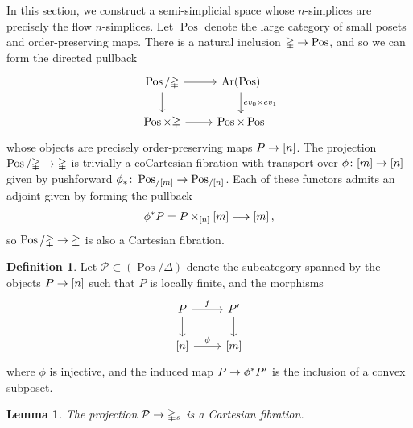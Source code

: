\documentclass[10pt]{amsart}
\numberwithin{equation}{section}
\newtheorem{lem}[prop]{Lemma}
\theoremstyle{definition}
\newtheorem{definition}[prop]{Definition}
\DeclareMathOperator{\Ar}{Ar}
\DeclareMathOperator{\Pos}{Pos}
\newcommand{\Simp}{\mathbb{\Delta}}
\newcommand{\cP}{\mathcal{P}}
\renewcommand{\to}{\mathchoice{\longrightarrow}{\rightarrow}{}{}}
\begin{document}
In this section, we construct a semi-simplicial space whose $n$-simplices are precisely the flow $n$-simplices.
Let $\Pos$ denote the large category of small posets and order-preserving maps.
There is a natural inclusion $\Simp \to \Pos$, and so we can form the directed pullback
\begin{equation*}
	\begin{tikzcd}
		\Pos / \Simp \arrow[r] \arrow[d]      &   \Ar(\Pos)  \arrow[d, "ev_{0}\times ev_{1}"] \\
		\Pos \times \Simp  \arrow[r]               &  \Pos\times \Pos
	\end{tikzcd}
\end{equation*}
whose objects are precisely order-preserving maps $P\to [n]$.
The projection $\Pos / \Simp \to \Simp$ is trivially a coCartesian fibration with transport over $\phi\colon [m] \to [n]$ given by pushforward $\phi_{*}\colon \Pos_{/[m]} \to \Pos_{/[n]}$.
Each of these functors admits an adjoint given by forming the pullback
\begin{align*}
	\phi^{*}P = P\times_{[n]} [m] \to [m] \,,
\end{align*}
so $\Pos / \Simp \to \Simp$ is also a Cartesian fibration.
\begin{definition}\label{def:cP}
	Let $\cP \subset (\Pos/\Simp)$ denote the subcategory spanned by the objects $P\to [n]$ such that $P$ is locally finite, and the morphisms
	\begin{equation*}
		\begin{tikzcd}\label{eq:cP}
			P \arrow[r, "f"] \arrow[d]      &   P'  \arrow[d] \\
			{[n]}  \arrow[r, "\phi"]               &  {[m]}
		\end{tikzcd}
	\end{equation*}
	where $\phi$ is injective, and the induced map $P \to \phi^{*}P'$ is the inclusion of a convex subposet.
\end{definition}

\begin{lem}\label{lem:sPSinginj_right_fib}
	The projection $\cP \to \Simp_{s}$ is a Cartesian fibration.
\end{lem}
\end{document}
